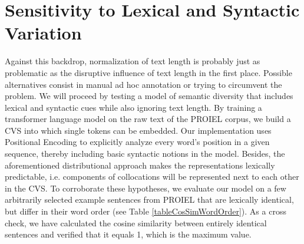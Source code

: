 \documentclass[oneside]{book}
\begin{document}
\section{Sensitivity to Lexical and Syntactic Variation}
Against this backdrop, normalization of text length is probably just as problematic as the disruptive influence of text length in the first place. Possible alternatives consist in manual ad hoc annotation or trying to circumvent the problem. We will proceed by testing a model of semantic diversity that includes lexical and syntactic cues while also ignoring text length. By training a transformer language model \parencite[9]{vaswaniAttentionAllYou2017} on the raw text of the PROIEL corpus, we build a \gls{CVS} into which single tokens can be embedded. Our implementation uses Positional Encoding \parencite[4]{lampleCrosslingualLanguageModel2019} to explicitly analyze every word's position in a given sequence, thereby including basic syntactic notions in the model. Besides, the aforementioned distributional approach makes the representations lexically predictable, i.e. components of collocations will be represented next to each other in the \gls{CVS}. To corroborate these hypotheses, we evaluate our model on a few arbitrarily selected example sentences from PROIEL that are lexically identical, but differ in their word order (see Table \ref{tableCosSimWordOrder}). As a cross check, we have calculated the cosine similarity between entirely identical sentences and verified that it equals 1, which is the maximum value.
\end{document}

